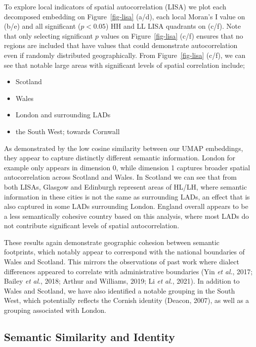 \documentclass[
  letterpaper,
  11pt,
  english,
  onehalfspacing,
  headsepline]{MastersDoctoralThesis}
\providecommand{\tightlist}{%
  \setlength{\itemsep}{0pt}\setlength{\parskip}{0pt}}\usepackage{longtable,booktabs,array}
\begin{document}
To explore local indicators of spatial autocorrelation (LISA) we plot
each decomposed embedding on Figure~\ref{fig-lisa} (a/d), each local
Moran's I value on (b/e) and all significant (\(p<0.05\)) HH and LL LISA
quadrants on (c/f). Note that only selecting significant \(p\) values on
Figure~\ref{fig-lisa} (c/f) ensures that no regions are included that
have values that could demonstrate autocorrelation even if randomly
distributed geographically. From Figure~\ref{fig-lisa} (c/f), we can see
that notable large areas with significant levels of spatial correlation
include;

\begin{itemize}
\tightlist
\item
  Scotland
\item
  Wales
\item
  London and surrounding LADs
\item
  the South West; towards Cornwall
\end{itemize}

As demonstrated by the low cosine similarity between our UMAP
embeddings, they appear to capture distinctly different semantic
information. London for example only appears in dimension 0, while
dimension 1 captures broader spatial autocorrelation across Scotland and
Wales. In Scotland we can see that from both LISAs, Glasgow and
Edinburgh represent areas of HL/LH, where semantic information in these
cities is not the same as surrounding LADs, an effect that is also
captured in some LADs surrounding London. England overall appears to be
a less semantically cohesive country based on this analysis, where most
LADs do not contribute significant levels of spatial autocorrelation.

These results again demonstrate geographic cohesion between semantic
footprints, which notably appear to correspond with the national
boundaries of Wales and Scotland. This mirrors the observations of past
work where dialect differences appeared to correlate with administrative
boundaries (Yin \emph{et al.}, 2017; Bailey \emph{et al.}, 2018; Arthur
and Williams, 2019; Li \emph{et al.}, 2021). In addition to Wales and
Scotland, we have also identified a notable grouping in the South West,
which potentially reflects the Cornish identity (Deacon, 2007), as well
as a grouping associated with London.

\hypertarget{semantic-similarity-and-identity}{%
\subsection{Semantic Similarity and
Identity}\label{semantic-similarity-and-identity}}
\end{document}
